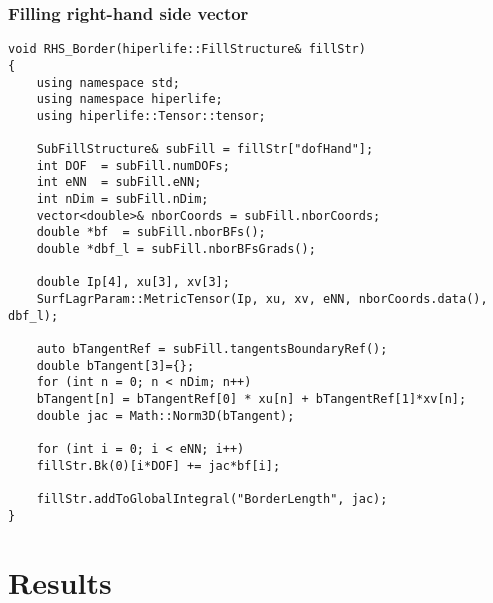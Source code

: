 \documentclass[]{article}
\begin{document}
\subsubsection{Filling right-hand side vector} \label{sec: rhs}
\begin{lstlisting}
void RHS_Border(hiperlife::FillStructure& fillStr)
{
	using namespace std;
	using namespace hiperlife;
	using hiperlife::Tensor::tensor;

	SubFillStructure& subFill = fillStr["dofHand"];
	int DOF  = subFill.numDOFs;
	int eNN  = subFill.eNN; 
	int nDim = subFill.nDim;
	vector<double>& nborCoords = subFill.nborCoords;
	double *bf  = subFill.nborBFs();
	double *dbf_l = subFill.nborBFsGrads();
	
	double Ip[4], xu[3], xv[3];
	SurfLagrParam::MetricTensor(Ip, xu, xv, eNN, nborCoords.data(), dbf_l);
	
	auto bTangentRef = subFill.tangentsBoundaryRef();
	double bTangent[3]={};
	for (int n = 0; n < nDim; n++)
	bTangent[n] = bTangentRef[0] * xu[n] + bTangentRef[1]*xv[n];
	double jac = Math::Norm3D(bTangent);
	
	for (int i = 0; i < eNN; i++)
	fillStr.Bk(0)[i*DOF] += jac*bf[i];
	
	fillStr.addToGlobalIntegral("BorderLength", jac);
}
\end{lstlisting}
\section{Results} \label{sec: rst}
\end{document}
